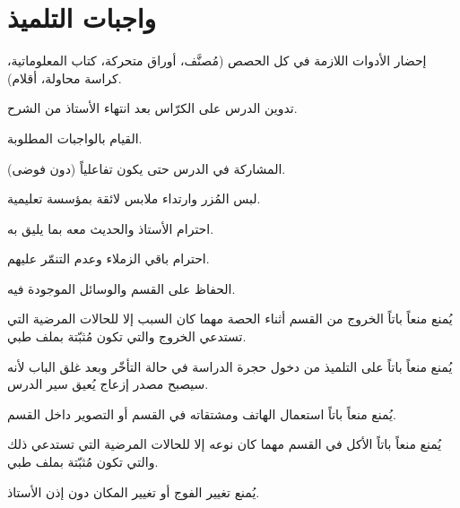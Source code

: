 \documentclass[12pt, a4paper]{article}
\begin{document}
\vspace{0.8cm}
\newpage

\section{واجبات التلميذ}

\begin{studentlist}
  \item إحضار الأدوات اللازمة في كل الحصص (مُصنَّف، أوراق متحركة،
        كتاب المعلوماتية، كراسة محاولة، أقلام).

  \item تدوين الدرس على الكرّاس بعد انتهاء الأستاذ من الشرح.

  \item القيام بالواجبات المطلوبة.

  \item المشاركة في الدرس حتى يكون تفاعلياً (دون فوضى).

  \item لبس المُزر وارتداء ملابس لائقة بمؤسسة تعليمية.

  \item احترام الأستاذ والحديث معه بما يليق به.

  \item احترام باقي الزملاء وعدم التنمّر عليهم.

  \item الحفاظ على القسم والوسائل الموجودة فيه.

  \item يُمنع منعاً باتاً الخروج من القسم أثناء الحصة مهما كان السبب
        إلا للحالات المرضية التي تستدعي الخروج والتي تكون مُثبّتة
        بملف طبي.

  \item يُمنع منعاً باتاً على التلميذ من دخول حجرة الدراسة في حالة
        التأخّر وبعد غلق الباب لأنه سيصبح مصدر إزعاج يُعيق سير الدرس.

  \item يُمنع منعاً باتاً استعمال الهاتف ومشتقاته في القسم أو التصوير
        داخل القسم.

  \item يُمنع منعاً باتاً الأكل في القسم مهما كان نوعه إلا للحالات
        المرضية التي تستدعي ذلك والتي تكون مُثبّتة بملف طبي.

  \item يُمنع تغيير الفوج أو تغيير المكان دون إذن الأستاذ.
\end{studentlist}
\end{document}
